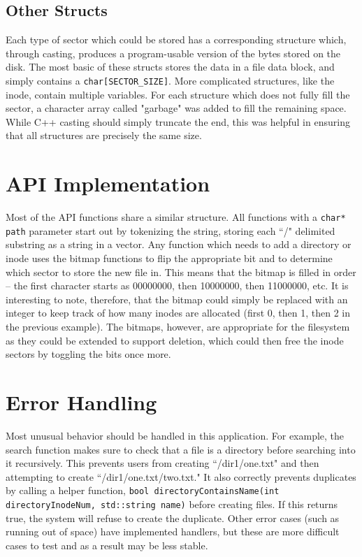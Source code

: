 \documentclass[]{article}
\begin{document}
\subsection{Other Structs}
Each type of sector which could be stored has a corresponding structure which, through casting, produces a program-usable version of the bytes stored on the disk. The most basic of these structs stores the data in a file data block, and simply contains a \texttt{char[SECTOR\_SIZE]}. More complicated structures, like the inode, contain multiple variables. For each structure which does not fully fill the sector, a character array called "garbage" was added to fill the remaining space. While C++ casting should simply truncate the end, this was helpful in ensuring that all structures are precisely the same size.

\section{API Implementation}
Most of the API functions share a similar structure. All functions with a \texttt{char* path} parameter start out by tokenizing the string, storing each ``/" delimited substring as a string in a vector. Any function which needs to add a directory or inode uses the bitmap functions to flip the appropriate bit and to determine which sector to store the new file in. This means that the bitmap is filled in order -- the first character starts as 00000000, then 10000000, then 11000000, etc. It is interesting to note, therefore, that the bitmap could simply be replaced with an integer to keep track of how many inodes are allocated (first 0, then 1, then 2 in the previous example). The bitmaps, however, are appropriate for the filesystem as they could be extended to support deletion, which could then free the inode sectors by toggling the bits once more.

\section{Error Handling}
Most unusual behavior should be handled in this application. For example, the search function makes sure to check that a file is a directory before searching into it recursively. This prevents users from creating ``/dir1/one.txt" and then attempting to create ``/dir1/one.txt/two.txt." It also correctly prevents duplicates by calling a helper function, \texttt{bool directoryContainsName(int directoryInodeNum, std::string name)} before creating files. If this returns true, the system will refuse to create the duplicate. Other error cases (such as running out of space) have implemented handlers, but these are more difficult cases to test and as a result may be less stable.
\end{document}
